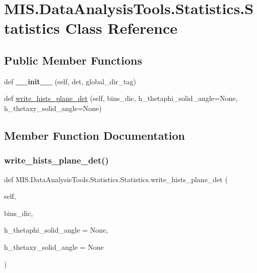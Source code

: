 \hypertarget{classMIS_1_1DataAnalysisTools_1_1Statistics_1_1Statistics}{}\section{M\+I\+S.\+Data\+Analysis\+Tools.\+Statistics.\+Statistics Class Reference}
\label{classMIS_1_1DataAnalysisTools_1_1Statistics_1_1Statistics}
\subsection*{Public Member Functions}
\begin{DoxyCompactItemize}
\item 
\mbox{\label{classMIS_1_1DataAnalysisTools_1_1Statistics_1_1Statistics_a8d50d318fea173f64fad899135d337a2}} 
def {\bfseries \+\_\+\+\_\+init\+\_\+\+\_\+} (self, det, global\+\_\+dir\+\_\+tag)
\item 
def \hyperlink{classMIS_1_1DataAnalysisTools_1_1Statistics_1_1Statistics_ac42eb3b43b18175775a3b6d4888ab910}{write\+\_\+hists\+\_\+plane\+\_\+det} (self, bins\+\_\+dic, h\+\_\+thetaphi\+\_\+solid\+\_\+angle=None, h\+\_\+thetaxy\+\_\+solid\+\_\+angle=None)
\end{DoxyCompactItemize}


\subsection{Member Function Documentation}
\mbox{\label{classMIS_1_1DataAnalysisTools_1_1Statistics_1_1Statistics_ac42eb3b43b18175775a3b6d4888ab910}} 
\subsubsection{\texorpdfstring{write\+\_\+hists\+\_\+plane\+\_\+det()}{write\_hists\_plane\_det()}}
{\footnotesize\ttfamily def M\+I\+S.\+Data\+Analysis\+Tools.\+Statistics.\+Statistics.\+write\+\_\+hists\+\_\+plane\+\_\+det (\begin{DoxyParamCaption}\item[{}]{self,  }\item[{}]{bins\+\_\+dic,  }\item[{}]{h\+\_\+thetaphi\+\_\+solid\+\_\+angle = {\ttfamily None},  }\item[{}]{h\+\_\+thetaxy\+\_\+solid\+\_\+angle = {\ttfamily None} }\end{DoxyParamCaption})}


